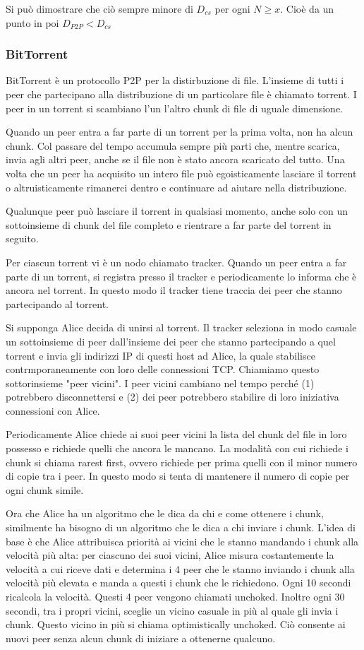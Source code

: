 \documentclass{book}
\begin{document}
Si può dimostrare che ciò sempre minore di $D_{cs}$ per ogni $N \geq x$. Cioè da un punto in poi $D_{P2P} < D_{cs}$

\subsubsection*{BitTorrent}
BitTorrent è un protocollo P2P per la distirbuzione di file. L'insieme di tutti i peer che partecipano alla distribuzione di un particolare file è chiamato torrent. I peer in un torrent si scambiano l'un l'altro chunk di file di uguale dimensione.

Quando un peer entra a far parte di un torrent per la prima volta, non ha alcun chunk. Col passare del tempo accumula sempre più parti che, mentre scarica, invia agli altri peer, anche se il file non è stato ancora scaricato del tutto. Una volta che un peer ha acquisito un intero file può egoisticamente lasciare il torrent o altruisticamente rimanerci dentro e continuare ad aiutare nella distribuzione.

Qualunque peer può lasciare il torrent in qualsiasi momento, anche solo con un sottoinsieme di chunk del file completo e rientrare a far parte del torrent in seguito.

Per ciascun torrent vi è un nodo chiamato tracker. Quando un peer entra a far parte di un torrent, si registra presso il tracker e periodicamente lo informa che è ancora nel torrent. In questo modo il tracker tiene traccia dei peer che stanno partecipando al torrent.

Si supponga Alice decida di unirsi al torrent. Il tracker seleziona in modo casuale un sottoinsieme di peer dall'insieme dei peer che stanno partecipando a quel torrent e invia gli indirizzi IP di questi host ad Alice, la quale stabilisce contrmporaneamente con loro delle connessioni TCP. Chiamiamo questo sottorinsieme "peer vicini". I peer vicini cambiano nel tempo perché (1) potrebbero disconnettersi e (2) dei peer potrebbero stabilire di loro iniziativa connessioni con Alice.

Periodicamente Alice chiede ai suoi peer vicini la lista del chunk del file in loro possesso e richiede quelli che ancora le mancano. La modalità con cui richiede i chunk si chiama rarest first, ovvero richiede per prima quelli con il minor numero di copie tra i peer. In questo modo si tenta di mantenere il numero di copie per ogni chunk simile.

Ora che Alice ha un algoritmo che le dica da chi e come ottenere i chunk, similmente ha bisogno di un algoritmo che le dica a chi inviare i chunk. L'idea di base è che Alice attribuisca priorità ai vicini che le stanno mandando i chunk alla velocità più alta: per ciascuno dei suoi vicini, Alice misura costantemente la velocità a cui riceve dati e determina i 4 peer che le stanno inviando i chunk alla velocità più elevata e manda a questi i chunk che le richiedono. Ogni 10 secondi ricalcola la velocità. Questi 4 peer vengono chiamati unchoked. Inoltre ogni 30 secondi, tra i propri vicini, sceglie un vicino casuale in più al quale gli invia i chunk. Questo vicino in più si chiama optimistically unchoked. Ciò consente ai nuovi peer senza alcun chunk di iniziare a ottenerne qualcuno.
\end{document}
